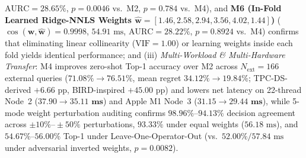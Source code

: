 \documentclass[10pt,a4paper]{article}
\begin{document}
\begin{enumerate}[leftmargin=1.5em,itemsep=0.8pt]
$\text{AURC}=28.65\%$, $p=0.0046$ vs.\ M2, $p=0.784$ vs.\ M4), and \textbf{M6 (In-Fold Learned Ridge-NNLS Weights $\hat{\mathbf{w}}=[1.46,2.58,2.94,3.56,4.02,1.44]$)} ($\cos(\mathbf{w},\hat{\mathbf{w}})=0.9998$, $54.91\text{ ms}$, $\text{AURC}=28.22\%$, $p=0.8924$ vs.\ M4) confirms that eliminating linear collinearity ($\text{VIF}=1.00$) or learning weights inside each fold yields identical performance; and (iii) \emph{Multi-Workload \& Multi-Hardware Transfer}: M4 improves zero-shot Top-1 accuracy over M2 across $N_{\text{ext}}=166$ external queries ($71.08\%\rightarrow\mathbf{76.51\%}$, mean regret $34.12\%\rightarrow\mathbf{19.84\%}$; TPC-DS-derived $+6.66\text{ pp}$, BIRD-inspired $+45.00\text{ pp}$) and lowers net latency on 22-thread Node~2 ($37.90\rightarrow\mathbf{35.11\text{ ms}}$) and Apple M1 Node~3 ($31.15\rightarrow\mathbf{29.44\text{ ms}}$), while 5-mode weight perturbation auditing confirms $98.96\%\text{--}94.13\%$ decision agreement across $\pm 10\%\text{--}\pm 50\%$ perturbations, $93.33\%$ under equal weights ($56.18\text{ ms}$), and $54.67\%\text{--}56.00\%$ Top-1 under Leave-One-Operator-Out (vs.\ $52.00\% / 57.84\text{ ms}$ under adversarial inverted weights, $p=0.0082$).

\end{enumerate}
\end{document}
